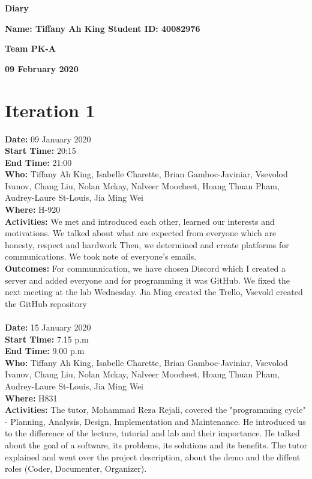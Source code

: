 \documentclass[12pt]{article}
\begin{document}
\vspace*{0.2in}
\centerline{\bf\Large Diary}

\vspace*{0.2in}
\centerline{\bf\Large Name: Tiffany Ah King  Student ID: 40082976}

\vspace*{0.2in}
\centerline{\bf\Large Team PK-A}

\vspace*{0.2in}
\centerline{\bf\Large 09 February 2020}

\section{Iteration 1}

{\bf Date:} 09 January 2020\\
{\bf Start Time:} 20:15\\
{\bf End Time:} 21:00 \\
{\bf Who:} Tiffany Ah King, Isabelle Charette, Brian Gamboc-Javiniar, Vsevolod Ivanov,
Chang Liu, Nolan Mckay, Nalveer Moocheet, Hoang Thuan Pham, Audrey-Laure St-Louis, Jia Ming Wei\\
{\bf Where:} H-920 \\
{\bf Activities:} We met and introduced each other, learned our interests and motivations. We talked about what are expected from everyone which are honesty, respect and hardwork Then, we determined and create platforms for communications. We took note of everyone's emails.\\
{\bf Outcomes:} For communnication, we have chosen Discord which I created a server and added everyone and for programming it was GitHub. We fixed the next meeting at the lab Wednesday. Jia Ming created the Trello, Vsevold created the GitHub repository \\ \\


{\bf Date:} 15 January 2020\\
{\bf Start Time:} 7.15 p.m\\
{\bf End Time:} 9.00 p.m\\
{\bf Who:}  Tiffany Ah King, Isabelle Charette, Brian Gamboc-Javiniar, Vsevolod Ivanov,
Chang Liu, Nolan Mckay, Nalveer Moocheet, Hoang Thuan Pham, Audrey-Laure St-Louis, Jia Ming Wei \\
{\bf Where:} H831 \\
{\bf Activities:} The tutor, Mohammad Reza Rejali, covered the "programming cycle" - Planning, Analysis, Design, Implementation and Maintenance. He introduced us to the difference of the lecture, tutorial and lab and their importance. He talked about the goal of a software, its problems, its solutions and its benefits. The tutor explained and went over the project description, about the demo and the diffent roles (Coder, Documenter, Organizer).\\
\end{document}
